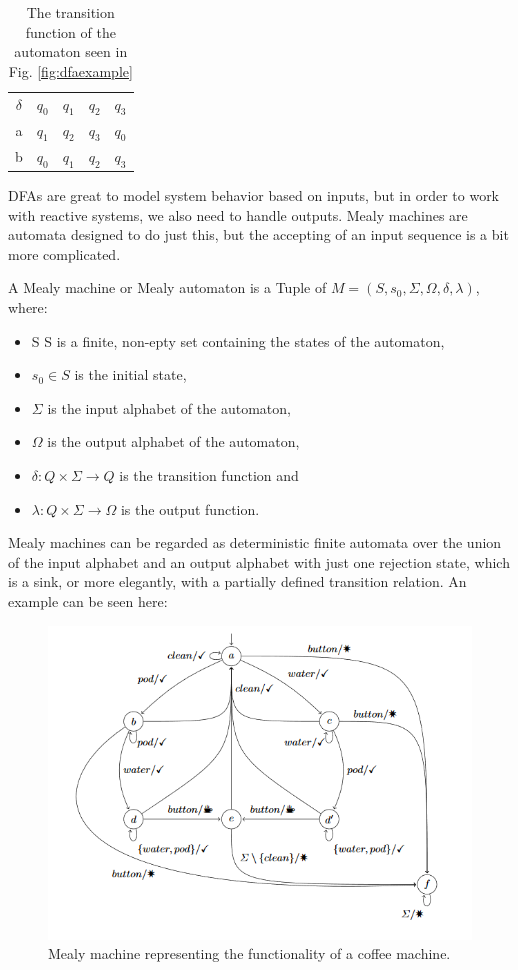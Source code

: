 \begin{table}[H]
\centering
\begin{tabular}{|c|cccc|}
	\hline
	$\delta$ & $q_0$ & $q_1$ & $q_2$ & $q_3$\\ \cline{1-5}
	a & $q_1$ & $q_2$ & $q_3$ & $q_0$ \\	
	b & $q_0$ & $q_1$ & $q_2$ & $q_3$ \\	\hline
\end{tabular}
\caption{The transition function of the automaton seen in Fig. \ref{fig:dfaexample}}
\label{tab:dfaexampledelta}
\end{table}

DFAs are great to model system behavior based on inputs, but in order to work with reactive systems, we also need to handle outputs. Mealy machines are automata designed to do just this, but the accepting of an input sequence is a bit more complicated.


\begin{definition}
	A Mealy machine or Mealy automaton is a Tuple of $ M=(S,s_{0},\Sigma,\Omega,\delta,\lambda) $, where:
	\begin{itemize}
		\item S S is a finite, non-epty set containing the states of the automaton,
		\item $s_{0} \in S$ is the initial state,
		\item $\Sigma$ is the input alphabet of the automaton,
		\item $\Omega$ is the output alphabet of the automaton,
		\item $\delta: Q\times \Sigma \to Q$ is the transition function and
		\item $\lambda: Q\times \Sigma \to \Omega$ is the output function. 
	\end{itemize}
\end{definition}

\noindent Mealy machines can be regarded as deterministic finite automata over the union of the input alphabet and an output alphabet with just one rejection state, which is a sink, or more elegantly, with a partially defined transition relation. An example can be seen here:

\begin{figure}[H]
	\centering
	\includegraphics[width=0.7\linewidth]{content/coffeemealy}
	\caption{Mealy machine representing the functionality of a coffee machine.\cite{Steffen2011}}
	\label{fig:coffeemealy}
\end{figure}


